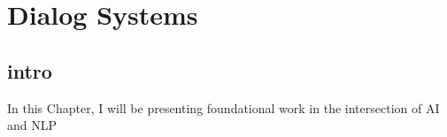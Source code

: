 \chapter{Dialog Systems}\label{dialog}
\section{intro}\label{sec:intro}
In this Chapter, I will be presenting foundational work in the intersection of AI and NLP